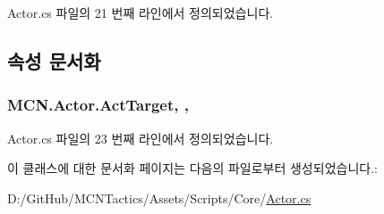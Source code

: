 Actor.\+cs 파일의 21 번째 라인에서 정의되었습니다.



\subsection{속성 문서화}
\subsubsection[{\texorpdfstring{Act\+Target}{ActTarget}}]{ M\+C\+N.\+Actor.\+Act\+Target\hspace{0.3cm}{\ttfamily [get]}, {}, {\ttfamily [protected]}}\hypertarget{class_m_c_n_1_1_actor_a1d809d2994dcccb6a8fcc665afa1ca6f}{}\label{class_m_c_n_1_1_actor_a1d809d2994dcccb6a8fcc665afa1ca6f}


Actor.\+cs 파일의 23 번째 라인에서 정의되었습니다.



이 클래스에 대한 문서화 페이지는 다음의 파일로부터 생성되었습니다.\+:\begin{DoxyCompactItemize}
\item 
D\+:/\+Git\+Hub/\+M\+C\+N\+Tactics/\+Assets/\+Scripts/\+Core/\hyperlink{_actor_8cs}{Actor.\+cs}\end{DoxyCompactItemize}
